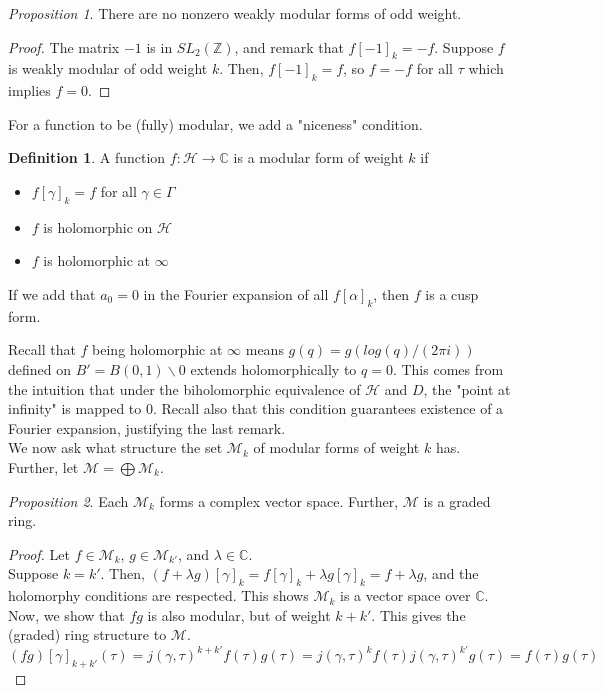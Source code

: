 \documentclass[11pt]{article}
\theoremstyle{definition}
\newtheorem{definition}{Definition}[section]
\theoremstyle{example}
\theoremstyle{remark}
\theoremstyle{lemma}
\theoremstyle{proposition}
\newtheorem{proposition}{Proposition}[section]
\theoremstyle{Problem}
\theoremstyle{Solution}
\theoremstyle{theorem}
\theoremstyle{corollary}
\begin{document}
\begin{proposition}
There are no nonzero weakly modular forms of odd weight.
\end{proposition}
\begin{proof}
The matrix $-1$ is in $SL_2(\mathbb{Z})$, and remark that $f[-1]_k = -f$. Suppose $f$ is weakly modular of odd weight $k$. Then, $f[-1]_k = f$, so $f = -f$ for all $\tau$ which implies $f = 0$.
\end{proof}
For a function to be (fully) modular, we add a "niceness" condition.
\begin{definition}
A function $f: \mathcal{H} \to \mathbb{C}$ is a modular form of weight $k$ if
\begin{itemize}
\item $f[\gamma]_k = f$ for all $\gamma \in \Gamma$
\item $f$ is holomorphic on $\mathcal{H}$
\item $f$ is holomorphic at $\infty$
\end{itemize}
If we add that $a_0 = 0$ in the Fourier expansion of all $f[\alpha]_k$, then $f$ is a cusp form.
\end{definition}

Recall that $f$ being holomorphic at $\infty$ means $g(q) = g(log(q)/(2\pi i))$ defined on $B' = B(0,1)\backslash {0}$ extends holomorphically to $q=0$. This comes from the intuition that under the biholomorphic equivalence of $\mathcal{H}$ and $D$, the "point at infinity" is mapped to $0$. Recall also that this condition guarantees existence of a Fourier expansion, justifying the last remark.\\

We now ask what structure the set $\mathcal{M}_k$ of modular forms of weight $k$ has. Further, let $\mathcal{M} = \bigoplus \mathcal{M}_k$.
\begin{proposition} %
Each $\mathcal{M}_k$ forms a complex vector space. Further, $\mathcal{M}$ is a graded ring.
\end{proposition}
\begin{proof} 
Let $f\in \mathcal{M}_k$, $g\in \mathcal{M}_{k'}$, and $\lambda\in \mathbb{C}$.\\
Suppose $k=k'$. Then, $(f+\lambda g)[\gamma]_k = f[\gamma]_k + \lambda g[\gamma]_k = f + \lambda g$, and the holomorphy conditions are respected. This shows $\mathcal{M}_k$ is a vector space over $\mathbb{C}$.\\
Now, we show that $fg$ is also modular, but of weight $k+k'$. This gives the (graded) ring structure to $\mathcal{M}$. 
$$(fg)[\gamma]_{k+k'}(\tau) = j(\gamma, \tau)^{k+k'}f(\tau)g(\tau) = j(\gamma,\tau)^kf(\tau) j(\gamma,\tau)^{k'} g(\tau) = f(\tau)g(\tau)$$
\end{proof}
\end{document}
